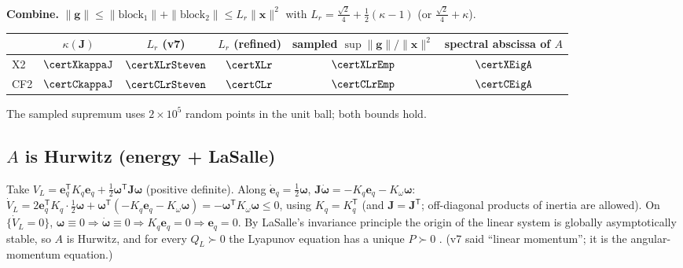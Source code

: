 \documentclass[11pt]{article}
\newcommand{\srcroot}{../../..}
\newcommand{\T}{^{\mathsf T}}
\newcommand{\code}[1]{\texttt{\detokenize{#1}}}
\theoremstyle{remark}
\newcommand{\listing}[4]{%
  }
\begin{document}
\textbf{Combine.} $\|\bm g\|\le\|\text{block}_1\|+\|\text{block}_2\|\le L_r\|\bm x\|^2$ with
$L_r=\frac{\sqrt2}4+\frac12(\kappa-1)$ (or $\frac{\sqrt2}4+\kappa$).
\begin{center}\small
\begin{tabular}{@{}lccccc@{}}
\toprule
& $\kappa(\bm J)$ & $L_r$ (v7) & $L_r$ (refined) & sampled $\sup\|\bm g\|/\|\bm x\|^2$ & spectral abscissa of $A$\\\midrule
X2 & $\certXkappaJ$ & $\certXLrSteven$ & $\certXLr$ & $\certXLrEmp$ & $\certXEigA$\\
CF2 & $\certCkappaJ$ & $\certCLrSteven$ & $\certCLr$ & $\certCLrEmp$ & $\certCEigA$\\
\bottomrule
\end{tabular}
\end{center}
The sampled supremum uses $2\times10^5$ random points in the unit ball; both bounds hold.
\listing{experiments/theory_certificate_2026-09-12/compute_local_certificate.py}{110}{120}{$\kappa$, both $L_r$, sampled supremum}

\subsection{$A$ is Hurwitz (energy + LaSalle)}
Take $V_L=\bm e_q\T K_q\bm e_q+\frac12\bm\omega\T\bm J\bm\omega$ (positive definite). Along
$\dot{\bm e}_q=\frac12\bm\omega$, $\bm J\dot{\bm\omega}=-K_q\bm e_q-K_\omega\bm\omega$:
$\dot V_L=2\bm e_q\T K_q\cdot\frac12\bm\omega+\bm\omega\T(-K_q\bm e_q-K_\omega\bm\omega)=-\bm\omega\T K_\omega\bm\omega\le0$,
using $K_q=K_q\T$ (and $\bm J=\bm J\T$; off-diagonal products of inertia are allowed). On
$\{\dot V_L=0\}$, $\bm\omega\equiv0\Rightarrow\dot{\bm\omega}\equiv0\Rightarrow K_q\bm e_q=0\Rightarrow\bm e_q=0$.
By LaSalle's invariance principle \cite{khalil2002nonlinear} the origin of the linear system is globally
asymptotically stable, so $A$ is Hurwitz, and for every $Q_L\succ0$ the Lyapunov equation has a unique
$P\succ0$ \cite{khalil2002nonlinear}. (v7 said ``linear momentum''; it is the angular-momentum equation.)
\listing{experiments/theory_certificate_2026-09-12/compute_local_certificate.py}{59}{65}{Lyapunov equation by vectorization}
\end{document}
